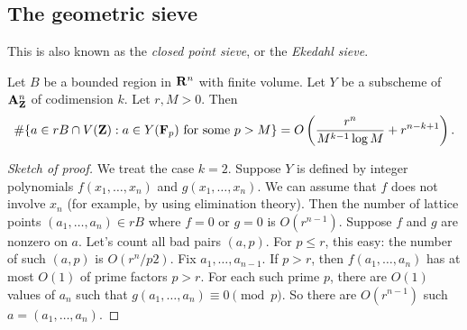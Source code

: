 \subsection{The geometric sieve}

This is also known as the \emph{closed point sieve}, or the \emph{Ekedahl 
sieve}. 

\begin{theo}
Let $B$ be a bounded region in $\mathbf{R}^n$ with finite volume. Let $Y$ be a 
subscheme of $\mathbf{A}_{\mathbf{Z}}^n$ of codimension $k$. Let $r,M>0$. Then 
\[
  \#\{a\in r B\cap V(\mathbf{Z}):a\in Y(\mathbf{F}_p)\text{ for some }p>M\} = O\left(\frac{r^n}{M^{k-1} \log M} + r^{n-k+1}\right) .
\]
\end{theo}
\begin{proof}[Sketch of proof]
We treat the case $k=2$. Suppose $Y$ is defined by integer polynomials 
$f(x_1,\dots,x_n)$ and $g(x_1,\dots,x_n)$. We can assume that $f$ does not 
involve $x_n$ (for example, by using elimination theory). Then the number of 
lattice points $(a_1,\dots,a_n)\in r B$ where $f=0$ or $g=0$ is 
$O(r^{n-1})$. Suppose $f$ and $g$ are nonzero on $a$. Let's count all bad pairs 
$(a,p)$. For $p\leqslant r$, this easy: the number of such $(a,p)$ is 
$O(r^n/p2)$. Fix $a_1,\dots,a_{n-1}$. If $p>r$, then $f(a_1,\dots,a_n)$ has at 
most $O(1)$ of prime factors $p>r$. For each such prime $p$, there are 
$O(1)$ values of $a_n$ such that $g(a_1,\dots,a_n)\equiv 0\pmod p$. So 
there are $O(r^{n-1})$ such $a=(a_1,\dots,a_n)$. 
\end{proof}




